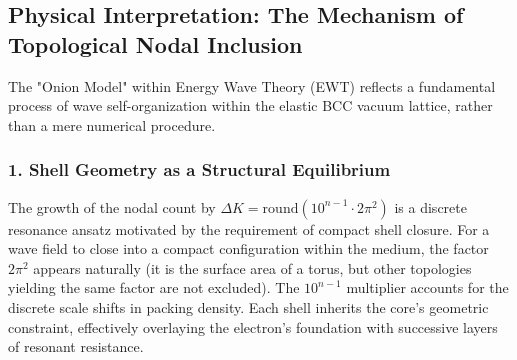 \documentclass[10pt,a4paper]{article}
\begin{document}
\subsection{Physical Interpretation: The Mechanism of Topological Nodal Inclusion}
\label{sec:physical_interpretation}

The "Onion Model" within Energy Wave Theory (EWT) reflects a fundamental process of wave self-organization within the elastic BCC vacuum lattice, rather than a mere numerical procedure.

\subsubsection*{1. Shell Geometry as a Structural Equilibrium}
The growth of the nodal count by $\Delta K = \text{round}(10^{n-1} \cdot 2\pi^2)$ is a discrete resonance ansatz motivated by the requirement of compact shell closure. For a wave field to close into a compact configuration within the medium, the factor $2\pi^2$ appears naturally (it is the surface area of a torus, but other topologies yielding the same factor are not excluded). The $10^{n-1}$ multiplier accounts for the discrete scale shifts in packing density. Each shell inherits the core's geometric constraint, effectively overlaying the electron's foundation with successive layers of resonant resistance.
\end{document}
